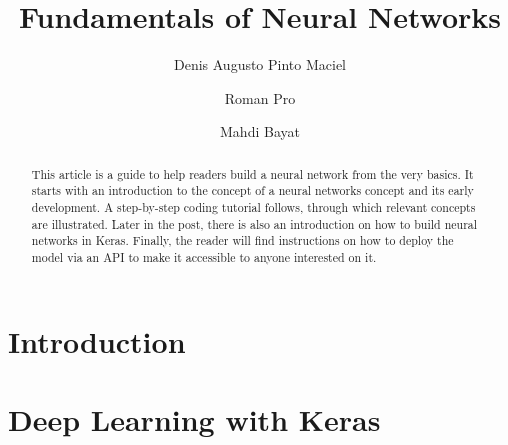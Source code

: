 \documentclass[a4paper, 11pt]{article}
\begin{document}
\title{Fundamentals of Neural Networks}

\author[1]{Denis Augusto Pinto Maciel}
\author[1]{Roman Pro}
\author[1]{Mahdi Bayat}


\maketitle

\begin{abstract}
This article is a guide to help readers build a neural network from the very basics. It starts with an introduction to the concept of a neural networks concept and its early development. A step-by-step coding tutorial follows, through which relevant concepts are illustrated. Later in the post, there is also an introduction on how to build neural networks in Keras. Finally, the reader will find instructions on how to deploy the model via an API to make it accessible to anyone interested on it.
\end{abstract}

\section{Introduction}
\label{sec:intro}

\cite{chollet2018deep}

\section{Deep Learning with Keras}
\label{sec:keras}


% 

\printbibliography
\end{document}
